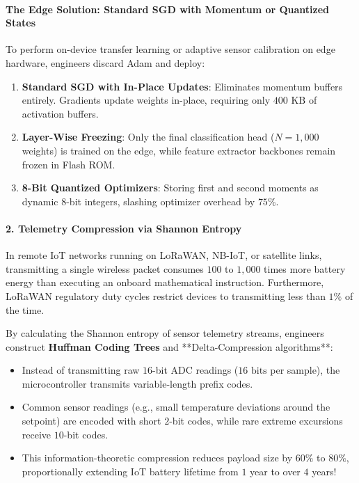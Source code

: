 \begin{iotbox}
\paragraph{The Edge Solution: Standard SGD with Momentum or Quantized States}
To perform on-device transfer learning or adaptive sensor calibration on edge hardware, engineers discard Adam and deploy:
\begin{enumerate}
    \item \textbf{Standard SGD with In-Place Updates}: Eliminates momentum buffers entirely. Gradients update weights in-place, requiring only $400\text{ KB}$ of activation buffers.
    \item \textbf{Layer-Wise Freezing}: Only the final classification head ($N = 1{,}000$ weights) is trained on the edge, while feature extractor backbones remain frozen in Flash ROM.
    \item \textbf{8-Bit Quantized Optimizers}: Storing first and second moments as dynamic 8-bit integers, slashing optimizer overhead by $75\%$.
\end{enumerate}

\paragraph{2. Telemetry Compression via Shannon Entropy}
In remote IoT networks running on LoRaWAN, NB-IoT, or satellite links, transmitting a single wireless packet consumes $100$ to $1{,}000$ times more battery energy than executing an onboard mathematical instruction. Furthermore, LoRaWAN regulatory duty cycles restrict devices to transmitting less than $1\%$ of the time.

By calculating the Shannon entropy of sensor telemetry streams, engineers construct \textbf{Huffman Coding Trees} and **Delta-Compression algorithms**:
\begin{itemize}
    \item Instead of transmitting raw $16$-bit ADC readings ($16\text{ bits}$ per sample), the microcontroller transmits variable-length prefix codes.
    \item Common sensor readings (e.g., small temperature deviations around the setpoint) are encoded with short $2$-bit codes, while rare extreme excursions receive $10$-bit codes.
    \item This information-theoretic compression reduces payload size by $60\%$ to $80\%$, proportionally extending IoT battery lifetime from $1$ year to over $4$ years!
\end{itemize}
\end{iotbox}

